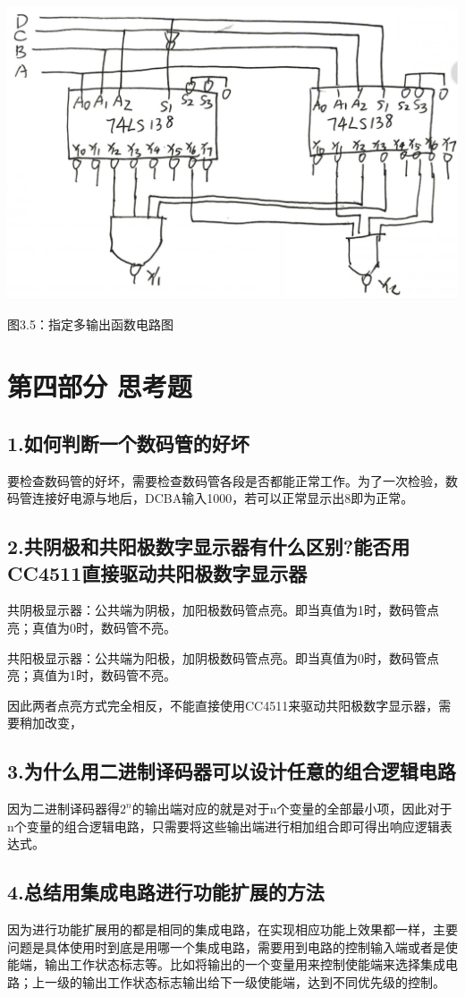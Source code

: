 \documentclass{ctexart}
\begin{document}
    \begin{minipage}[l]{\textwidth}
        \centering 
        \includegraphics[width=\linewidth]{3.5.png} 
        
        图3.5：指定多输出函数电路图
    \end{minipage}
    
    \section*{第四部分 \quad 思考题}
    \subsection*{1.如何判断一个数码管的好坏}
    要检查数码管的好坏，需要检查数码管各段是否都能正常工作。为了一次检验，数码管连接好电源与地后，DCBA输入1000，若可以正常显示出8即为正常。
    \subsection*{2.共阴极和共阳极数字显示器有什么区别?能否用CC4511直接驱动共阳极数字显示器}
    共阴极显示器：公共端为阴极，加阳极数码管点亮。即当真值为1时，数码管点亮；真值为0时，数码管不亮。
    
    共阳极显示器：公共端为阳极，加阴极数码管点亮。即当真值为0时，数码管点亮；真值为1时，数码管不亮。

    因此两者点亮方式完全相反，不能直接使用CC4511来驱动共阳极数字显示器，需要稍加改变，

    \subsection*{3.为什么用二进制译码器可以设计任意的组合逻辑电路}
    因为二进制译码器得$2^n$的输出端对应的就是对于n个变量的全部最小项，因此对于n个变量的组合逻辑电路，只需要将这些输出端进行相加组合即可得出响应逻辑表达式。

    \subsection*{4.总结用集成电路进行功能扩展的方法}
    因为进行功能扩展用的都是相同的集成电路，在实现相应功能上效果都一样，主要问题是具体使用时到底是用哪一个集成电路，需要用到电路的控制输入端或者是使能端，输出工作状态标志等。比如将输出的一个变量用来控制使能端来选择集成电路；上一级的输出工作状态标志输出给下一级使能端，达到不同优先级的控制。
\end{document}
